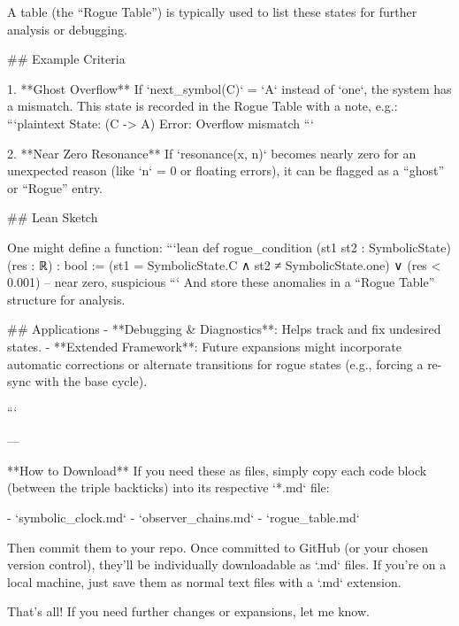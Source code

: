 A table (the “Rogue Table”) is typically used to list these states for further analysis or debugging.

## Example Criteria

1. **Ghost Overflow**  
   If `next_symbol(C)` = `A` instead of `one`, the system has a mismatch. This state is recorded in the Rogue Table with a note, e.g.:
   ```plaintext
   State: (C -> A)
   Error: Overflow mismatch
   ```

2. **Near Zero Resonance**  
   If `resonance(x, n)` becomes nearly zero for an unexpected reason (like `n` = 0 or floating errors), it can be flagged as a “ghost” or “Rogue” entry.

## Lean Sketch

One might define a function:
```lean
def rogue_condition (st1 st2 : SymbolicState) (res : ℝ) : bool :=
  (st1 = SymbolicState.C ∧ st2 ≠ SymbolicState.one) ∨
  (res < 0.001)  -- near zero, suspicious
```
And store these anomalies in a “Rogue Table” structure for analysis.

## Applications
- **Debugging & Diagnostics**: Helps track and fix undesired states.
- **Extended Framework**: Future expansions might incorporate automatic corrections or alternate transitions for rogue states (e.g., forcing a re-sync with the base cycle).

```

---

**How to Download**  
If you need these as files, simply copy each code block (between the triple backticks) into its respective `*.md` file:

- `symbolic_clock.md`
- `observer_chains.md`
- `rogue_table.md`

Then commit them to your repo. Once committed to GitHub (or your chosen version control), they’ll be individually downloadable as `.md` files. If you’re on a local machine, just save them as normal text files with a `.md` extension. 

That’s all! If you need further changes or expansions, let me know.